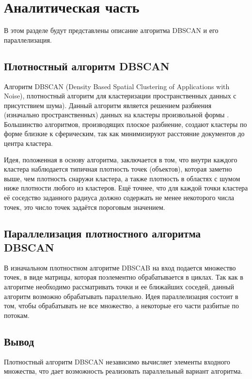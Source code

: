 \chapter{Аналитическая часть}

В этом разделе будут представлены описание алгоритма DBSCAN и его параллелизация.


\section{Плотностный алгоритм DBSCAN}

Алгоритм DBSCAN \cite{dbscan} (Density Based Spatial Clustering of Applications with Noise),
плотностный алгоритм для кластеризации пространственных данных с присутствием
шума). 
Данный алгоритм является решением разбиения (изначально пространственных) данных на кластеры произвольной формы \cite{cluster}.
Большинство алгоритмов, производящих плоское разбиение, создают кластеры по форме близкие к сферическим, так как минимизируют расстояние документов до центра кластера.

Идея, положенная в основу алгоритма, заключается в том, что внутри каждого кластера наблюдается типичная плотность точек (объектов), которая заметно выше, чем плотность снаружи кластера, а также плотность в областях с шумом ниже
плотности любого из кластеров. 
Ещё точнее, что для каждой точки кластера её соседство заданного радиуса должно содержать не менее некоторого числа точек, это число точек задаётся пороговым значением.

\section{Параллелизация плотностного алгоритма DBSCAN}

В изначальном плотностном алгоритме DBSCAB на вход подается множество точек, в виде матрицы, которая поэлементно обрабатывается в циклах.
Так как в алгоритме необходимо рассматривать точки и ее ближайших соседей, данный алгоритм возможно обрабатывать параллельно. 
Идея параллелизация состоит в том, чтобы обрабатывать не все множество, а некоторые его части разбитые по потокам.

\section*{Вывод}

Плотностный алгоритм DBSCAN независимо вычисляет элементы входного множества, что дает возможность реализовать параллельный вариант алгоритма.